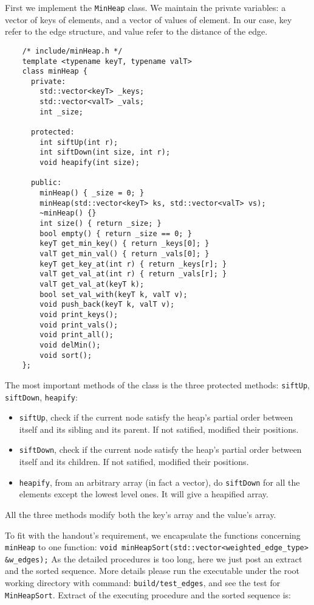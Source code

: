 First we implement the \verb|MinHeap| class. We maintain the private variables: a vector of keys of elements, and a vector of values of element. In our case, key refer to the edge structure, and value refer to the distance of the edge. 
\begin{verbatim}
    /* include/minHeap.h */
    template <typename keyT, typename valT>
    class minHeap {
      private:
        std::vector<keyT> _keys;
        std::vector<valT> _vals;
        int _size;
    
      protected:
        int siftUp(int r);
        int siftDown(int size, int r);
        void heapify(int size);
    
      public:
        minHeap() { _size = 0; }
        minHeap(std::vector<keyT> ks, std::vector<valT> vs);
        ~minHeap() {}
        int size() { return _size; }
        bool empty() { return _size == 0; }
        keyT get_min_key() { return _keys[0]; }
        valT get_min_val() { return _vals[0]; }
        keyT get_key_at(int r) { return _keys[r]; }
        valT get_val_at(int r) { return _vals[r]; }
        valT get_val_at(keyT k);
        bool set_val_with(keyT k, valT v);
        void push_back(keyT k, valT v);
        void print_keys();
        void print_vals();
        void print_all();
        void delMin();
        void sort();
    };
\end{verbatim}

The most important methods of the class is the three protected methods: \verb|siftUp|, \verb|siftDown|, \verb|heapify|:
\begin{itemize}
    \item \verb|siftUp|, check if the current node satisfy the heap's partial order between itself and its sibling and its parent. If not satified, modified their positions.
    \item \verb|siftDown|, check if the current node satisfy the heap's partial order between itself and its children. If not satified, modified their positions.
    \item \verb|heapify|, from an arbitrary array (in fact a vector), do \verb|siftDown| for all the elements except the lowest level ones. It will give a heapified array.
\end{itemize}
All the three methods modify both the key's array and the value's array.

To fit with the handout's requirement, we encapsulate the functions concerning \verb|minHeap| to one function: \texttt{void minHeapSort(std::vector<weighted_edge_type> &w_edges);} As the detailed procedures is too long, here we just post an extract and the sorted sequence. More details please run the executable under the root working directory with command: \verb|build/test_edges|, and see the test for \verb|MinHeapSort|. Extract of the executing procedure and the sorted sequence is:

